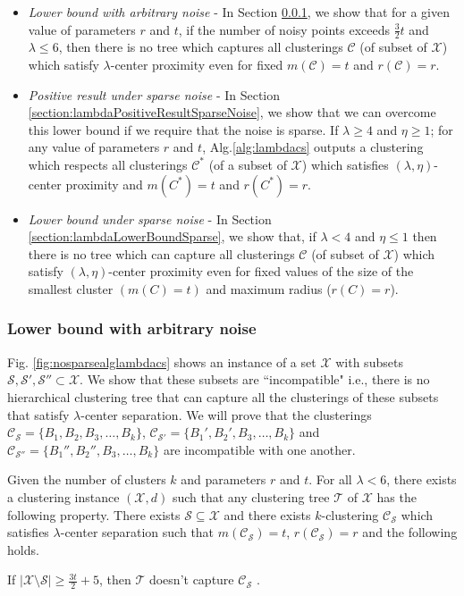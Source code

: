 \documentclass[anon,12pt]{colt2016} %
\newcommand{\mc}{\mathcal}
\begin{document}
\begin{itemize}
\item {\it Lower bound with arbitrary noise} - In Section \ref{section:lambdaLowerBoundArbitrary}, we show that for a given value of parameters $r$ and $t$, if the number of noisy points exceeds $\frac{3}{2}t$ and $\lambda \le 6$, then there is no tree which captures all clusterings $\mc C$ (of subset of $\mc X$) which satisfy $\lambda$-center proximity even for fixed $m(\mc C) = t$ and $r(\mc C) = r$.
\item  {\it Positive result under sparse noise} - In Section \ref{section:lambdaPositiveResultSparseNoise}, we show that we can overcome this lower bound if we require that the noise is sparse. If $\lambda \ge 4$ and $\eta \ge 1$; for any value of parameters $r$ and $t$, Alg.\ref{alg:lambdacs} outputs a clustering which respects all clusterings $\mc C^*$ (of a subset of $\mc X$) which satisfies $(\lambda, \eta)$-center proximity and $m(C^*)=t$ and $r(C^*) = r$.
\item  {\it Lower bound under sparse noise} - In Section \ref{section:lambdaLowerBoundSparse}, we show that, if $\lambda < 4$ and $\eta \le 1$ then there is no tree which can capture all clusterings $\mc C$ (of subset of $\mc X$) which satisfy $(\lambda, \eta)$-center proximity even for fixed values of the size of the smallest cluster $(m(C) = t)$ and maximum radius ($r(C) = r$).
\end{itemize} 


\subsubsection{Lower bound with arbitrary noise}
\label{section:lambdaLowerBoundArbitrary}



Fig. \ref{fig:nosparsealglambdacs} shows an instance of a set $\mc X$ with subsets $\mc S, \mc S', \mc S'' \subset \mc X$. We show that these subsets are ``incompatible" i.e., there is no hierarchical clustering tree that can capture all the clusterings of these subsets that satisfy $\lambda$-center separation. We will prove that the clusterings $\mc C_{\mc S} = \{B_1, B_2, B_3, \ldots, B_k\}$, $\mc C_{\mc S'} = \{B_1', B_2', B_3, \ldots, B_k\}$ and $\mc C_{\mc S''} = \{B_1'', B_2'', B_3, \ldots, B_k\}$ are incompatible with one another.

\begin{theorem}
\label{thm:nosparselambdaalg}
Given the number of clusters $k$ and parameters $r$ and $t$. For all $\lambda < 6$, there exists a clustering instance $(\mc X , d)$ such that any clustering tree $\mc T$ of $\mc X$ has the following property. There exists $\mc S \subseteq \mc X$ and there exists $k$-clustering $\mc C_{\mc S}$ which satisfies $\lambda$-center separation such that $m(\mc C_{\mc S}) = t$, $r(\mc C_{\mc S}) = r$ and the following holds.

If $|\mc X\setminus \mc S|\ge \frac{3t}{2}+5$, then $\mc T$ doesn't capture $\mc C_{\mc S}$ .
\end{theorem}
\end{document}
